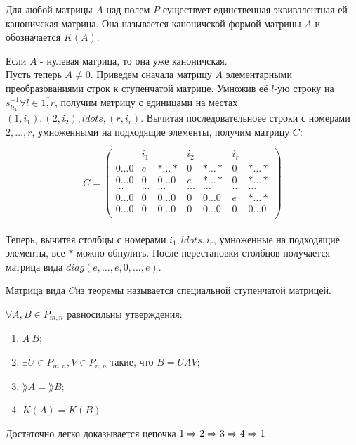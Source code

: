 \begin{proofs}
	Для любой матрицы $A$ над полем $P$ существует единственная эквивалентная ей каноничская матрица.
  Она называется каноничской формой матрицы $A$ и обозначается $K(A)$.
	\begin{dokvo}
    Если $A$ - нулевая матрица, то она уже каноничская.\\
    Пусть теперь $A \neq 0$. Приведем сначала матрицу $A$ элементарными преобразованиями строк к ступенчатой матрице.
    Умножив её $l$-ую строку на $s^{-1}_{li_1} \forall l \in \overline{1, r}$, получим матрицу
    с единицами на местах $(1, i_1), (2, i_2), ldots, (r, i_r)$. Вычитая последовательноеё строки с номерами $2, \ldots, r$, умноженными
    на подходящие элементы, получим матрицу $C$:


    $$C =
    \begin{pmatrix}
      & i_1 & & i_2 & & i_r & \\
      0\ldots0 & e & *\ldots* & 0 & *\ldots* & 0 & *\ldots* \\
      0\ldots0 & 0 & 0\ldots0 & e & *\ldots* & 0 & *\ldots* \\
      \ldots & \ldots & \ldots & \ldots & \ldots & \ldots & \ldots \\
      0\ldots0 & 0 & 0\ldots0 & 0 & 0\ldots0 & e & *\ldots* \\
      0\ldots0 & 0 & 0\ldots0 & 0 & 0\ldots0 & 0 & 0\ldots0 \\
    \end{pmatrix}$$\\

    Теперь, вычитая столбцы с номерами $i_1, ldots, i_r$, умноженные на подходящие элементы,
    все $*$ можно обнулить. После перестановки столбцов получается матрица вида $diag(e, \ldots, e, 0, \ldots, e)$.
	\end{dokvo}
\end{proofs}

\begin{defs}
	Матрица вида $C$из теоремы называется специальной ступенчатой матрицей.
\end{defs}

\begin{proofs}
	$\forall A,B \in P_{m,n}$ равносильны утверждения:
  \begin{enumerate}
  	\item $A~B$;
  	\item $\exists U \in P_{m,n}, V \in P_{n,n}$ такие, что $B = UAV$;
    \item $\rang{A} = \rang{B}$;
    \item $K(A) = K(B)$.
  \end{enumerate}
	\begin{dokvo}
    Достаточно легко доказывается цепочка $1 \Rightarrow 2 \Rightarrow 3 \Rightarrow 4 \Rightarrow 1$
	\end{dokvo}
\end{proofs}
